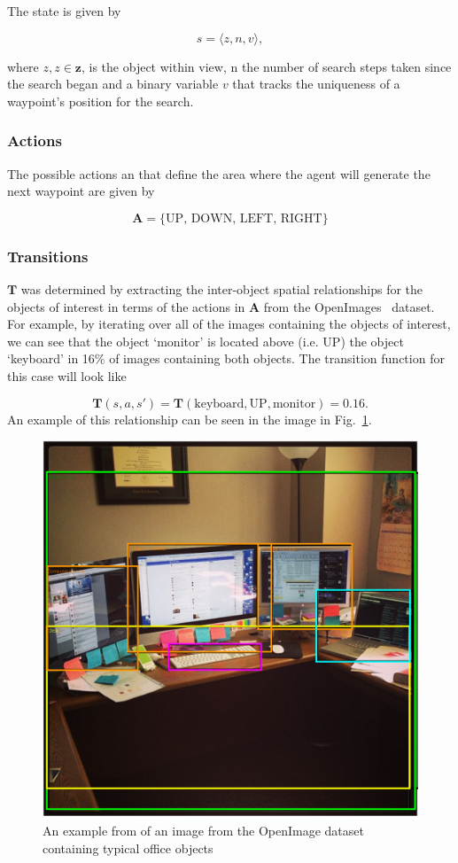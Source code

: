 \documentclass[runningheads]{llncs}
\begin{document}
The state is given by

\begin{equation}
  s = \langle z, n, v \rangle,
\end{equation}

\noindent where $z, z\in\mathbf{z}$, is the object within view, n the number of search steps taken since the search began and a binary variable $v$ that tracks the uniqueness of a waypoint's position for the search.

\subsubsection{Actions}

The possible actions an that define the area where the agent will generate the next waypoint are given by

\begin{equation}
  \mathbf{A} = \{ \textrm{UP, DOWN, LEFT, RIGHT} \}
\end{equation}

\subsubsection{Transitions}

$\mathbf{T}$ was determined by extracting the inter-object spatial relationships for the objects of interest in terms of the actions in $\mathbf{A}$ from the OpenImages~\cite{openimages} dataset. 
For example, by iterating over all of the images containing the objects of interest, we can see that the object `monitor' is located above (i.e. UP) the object `keyboard' in 16\% of images containing both objects. 
The transition function for this case will look like 

\begin{equation}
  \mathbf{T}(s, a, s') = \mathbf{T}(\textrm{keyboard}, \textrm{UP}, \textrm{monitor}) = 0.16.
\end{equation}
An example of this relationship can be seen in the image in Fig.~\ref{fig:openimage}.

\begin{figure}
  \centering
  \includegraphics[width=0.5\columnwidth]{figures/desk_example.png}
  \caption{An example from of an image from the OpenImage dataset~\cite{openimages} containing typical office objects}\label{fig:openimage}
\end{figure}
\end{document}
